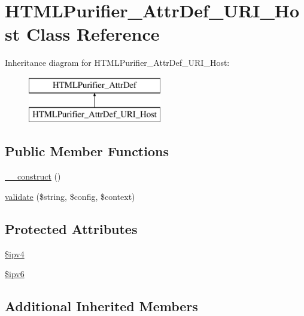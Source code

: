 \hypertarget{classHTMLPurifier__AttrDef__URI__Host}{\section{H\+T\+M\+L\+Purifier\+\_\+\+Attr\+Def\+\_\+\+U\+R\+I\+\_\+\+Host Class Reference}
\label{classHTMLPurifier__AttrDef__URI__Host}
}
Inheritance diagram for H\+T\+M\+L\+Purifier\+\_\+\+Attr\+Def\+\_\+\+U\+R\+I\+\_\+\+Host\+:\begin{figure}[H]
\begin{center}
\leavevmode
\includegraphics[height=2.000000cm]{classHTMLPurifier__AttrDef__URI__Host}
\end{center}
\end{figure}
\subsection*{Public Member Functions}
\begin{DoxyCompactItemize}
\item 
\hyperlink{classHTMLPurifier__AttrDef__URI__Host_ad0cfbf7c66566a9993b29050549cc7a1}{\+\_\+\+\_\+construct} ()
\item 
\hyperlink{classHTMLPurifier__AttrDef__URI__Host_acebcd21c25862e8f3db07b829163bf77}{validate} (\$string, \$config, \$context)
\end{DoxyCompactItemize}
\subsection*{Protected Attributes}
\begin{DoxyCompactItemize}
\item 
\hyperlink{classHTMLPurifier__AttrDef__URI__Host_aa0291fa531c33d1826f218bf0b044179}{\$ipv4}
\item 
\hyperlink{classHTMLPurifier__AttrDef__URI__Host_add553d6766b9ad3438b858365f371c59}{\$ipv6}
\end{DoxyCompactItemize}
\subsection*{Additional Inherited Members}



